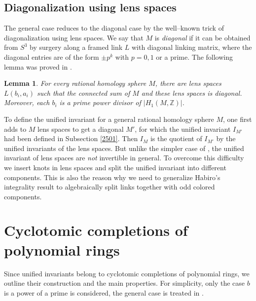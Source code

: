\documentclass[12pt]{amsart}
\theoremstyle{plain}
\newtheorem{lemma}[Thm]{Lemma}
\theoremstyle{definition}
\def\BZ{\mathbb Z}
\def\Z{\BZ}
\begin{document}
\subsection{Diagonalization using lens spaces} The general
case reduces to the diagonal case by
the well--known trick of diagonalization using lens spaces. We say that
$M$ is {\em diagonal} if it can be obtained from $S^3$ by surgery along a framed link
$L$  with diagonal linking matrix, where  the diagonal entries are of the
form $\pm p^k$ with $p=0,1$ or a prime.
The following lemma was proved in \cite[Proposition 3.2 (a)]{Le}.


\begin{lemma} For every rational homology sphere $M$,
 there are lens spaces $L(b_i,a_i)$ such that the connected
sum of $M$ and these
lens spaces is diagonal. Moreover, each $b_i$ is a prime power
 divisor of $|H_1(M,\Z)|$.
\label{diagonalization}
\end{lemma}

To define  the unified invariant for a general rational homology sphere $M$,
one first adds to $M$ lens spaces to get a diagonal $M'$, for which
the unified invariant $I_{M'}$ had been defined in Subsection \ref{2501}. Then
  $I_M$ is the quotient of $I_{M'}$ by the unified invariants of the lens
 spaces. But unlike the simpler
 case
of \cite{Le}, the unified invariant of lens spaces are {\em not} invertible
 in general.
To overcome this difficulty we insert knots in lens spaces and split the
 unified invariant into different components.
This is also the reason why we need to generalize Habiro's integrality
result to algebraically split links together with odd colored components.






\section{Cyclotomic completions of polynomial rings}\label{cyc}
Since unified invariants belong to
 cyclotomic completions of polynomial rings, we outline
their construction and the main properties. For simplicity, only the case
$b$ is a power of a prime is considered, the general case is treated in
\cite{BBL}.
\end{document}
